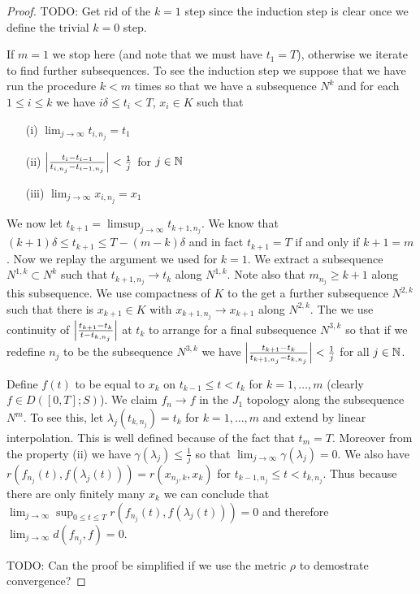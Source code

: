\begin{proof}
TODO: Get rid of the $k=1$ step since the induction step is clear once we define the trivial $k=0$ step.

If $m = 1$ we stop here (and note that we must have $t_1 = T$), otherwise we iterate to find further subsequences. 
To see the induction step we suppose that we have run the procedure $k<m$ times 
so that we have a subsequence $N^k$ and for each
$1 \leq i \leq k$ we have $i\delta \leq t_i < T$, $x_i \in K$ such that
\begin{itemize}
\item[(i)] $\lim_{j \to \infty} t_{i,n_j} = t_1$ 
\item[(ii)] $\left \vert \frac{t_i - t_{i-1}}{t_{i, n_j} - t_{i-1, n_j}} \right \vert < \frac{1}{j}$ for $j \in \mathbb{N}$
\item[(iii)] $\lim_{j \to \infty} x_{i,n_j} = x_1$ 
\end{itemize}
We now let $t_{k+1} = \limsup_{j \to \infty} t_{k+1, n_j}$.  We know 
that $(k+1) \delta \leq t_{k+1} \leq T - (m - k)\delta$ and in fact $t_{k+1} = T$ if and only if $k+1 = m$.  
Now we replay the argument we used for $k=1$.  We extract a subsequence $N^{1,k} \subset N^k$ such that $t_{k+1, n_j} \to t_k$ along $N^{1,k}$.  Note also
that $m_{n_j} \geq k+1$ along this subsequence.  We use
compactness of $K$ to the get a further subsequence $N^{2,k}$ such that there is $x_{k+1} \in K$ with $x_{k+1, n_j} \to x_{k+1}$ along $N^{2,k}$.  The we use
continuity of $\left \vert \frac{t_{k+1} - t_{k}}{t - t_{k, n_j}} \right \vert$ at $t_k$ to arrange for a final subsequence $N^{3,k}$ so that if we redefine $n_j$ to be the subsequence
$N^{3,k}$ we have $\left \vert \frac{t_{k+1}- t_{k}}{t_{k+1, n_j} - t_{k, n_j}} \right \vert < \frac{1}{j}$ for all $j \in \mathbb{N}$.

Define $f(t)$ to be equal to $x_k$ on $t_{k-1} \leq t < t_k$ for $k=1, \dotsc, m$ (clearly $f \in D([0,T]; S)$).  We claim $f_n \to f$ in the $J_1$ topology along the subsequence $N^m$.
To see this, let $\lambda_j(t_{k, n_j}) = t_k$ for $k=1, \dotsc, m$ and extend by linear interpolation.  This is well defined because of the fact that $t_m = T$.  
Moreover from the property (ii) we have $\gamma(\lambda_j) \leq \frac{1}{j}$ so that
$\lim_{j \to \infty} \gamma(\lambda_j) = 0$.  We also have $r(f_{n_j}(t), f(\lambda_j(t))) = r(x_{n_j, k}, x_k)$ for $t_{k-1, n_j} \leq t < t_{k, n_j}$.  Thus because there are only finitely many
$x_k$ we can conclude that $\lim_{j \to \infty} \sup_{0 \leq t \leq T} r(f_{n_j}(t), f(\lambda_j(t))) = 0$ and therefore $\lim_{j \to \infty} d(f_{n_j}, f) = 0$.

TODO: Can the proof be simplified if we use the metric $\rho$ to demostrate convergence?
\end{proof}

